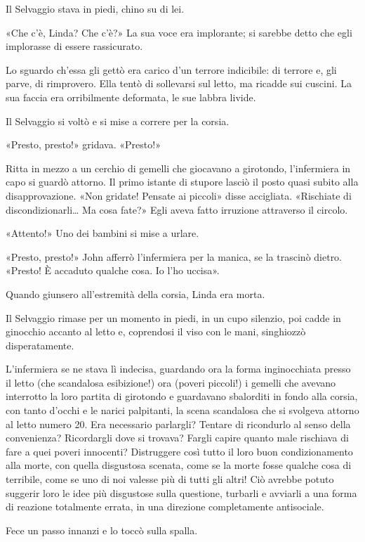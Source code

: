 \documentclass[
a5paper, %
10pt, %
twoside, 
onecolumn, %
openany, %
]{memoir}
\begin{document}
Il Selvaggio stava in piedi, chino su di lei.

«Che c’è, Linda? Che c’è?» La sua voce era implorante; si sarebbe detto che egli implorasse di essere rassicurato.

Lo sguardo ch’essa gli gettò era carico d’un terrore indicibile: di terrore e, gli parve, di rimprovero. Ella tentò di sollevarsi sul letto, ma ricadde sui cuscini. La sua faccia era orribilmente deformata, le sue labbra livide.

Il Selvaggio si voltò e si mise a correre per la corsia.

«Presto, presto!» gridava. «Presto!»

Ritta in mezzo a un cerchio di gemelli che giocavano a girotondo, l’infermiera in capo si guardò attorno. Il primo istante di stupore lasciò il posto quasi subito alla disapprovazione. «Non gridate! Pensate ai piccoli» disse accigliata. «Rischiate di discondizionarli… Ma cosa fate?» Egli aveva fatto irruzione attraverso il circolo.

«Attento!» Uno dei bambini si mise a urlare.

«Presto, presto!» John afferrò l’infermiera per la manica, se la trascinò dietro. «Presto! È accaduto qualche cosa. Io l’ho uccisa».

Quando giunsero all’estremità della corsia, Linda era morta.

Il Selvaggio rimase per un momento in piedi, in un cupo silenzio, poi cadde in ginocchio accanto al letto e, coprendosi il viso con le mani, singhiozzò disperatamente.

L’infermiera se ne stava lì indecisa, guardando ora la forma inginocchiata presso il letto (che scandalosa esibizione!) ora (poveri piccoli!) i gemelli che avevano interrotto la loro partita di girotondo e guardavano sbalorditi in fondo alla corsia, con tanto d’occhi e le narici palpitanti, la scena scandalosa che si svolgeva attorno al letto numero 20. Era necessario parlargli? Tentare di ricondurlo al senso della convenienza? Ricordargli dove si trovava? Fargli capire quanto male rischiava di fare a quei poveri innocenti? Distruggere così tutto il loro buon condizionamento alla morte, con quella disgustosa scenata, come se la morte fosse qualche cosa di terribile, come se uno di noi valesse più di tutti gli altri! Ciò avrebbe potuto suggerir loro le idee più disgustose sulla questione, turbarli e avviarli a una forma di reazione totalmente errata, in una direzione completamente antisociale.

Fece un passo innanzi e lo toccò sulla spalla.
\end{document}

